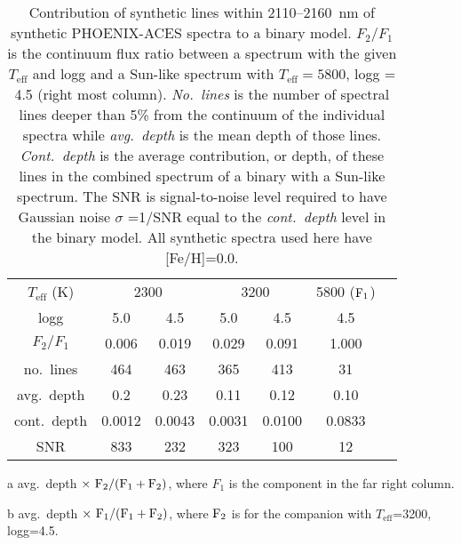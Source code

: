 
\begin{table}
    \small
    \centering
    \begin{threeparttable}[b]

   \caption{Contribution of synthetic lines within 2110--2160~nm of synthetic PHOENIX-ACES spectra to a binary model. \(F_{2}/F_{1}\) is the continuum flux ratio between a spectrum with the given \(T_{\textrm{eff}}\) and logg and a Sun-like spectrum with \(T_{\textrm{eff}}=5800\), logg = 4.5 (right most column). \emph{No.\ lines} is the number of spectral lines deeper than 5\% from the continuum of the individual spectra while \emph{avg.\ depth} is the mean depth of those lines. \emph{Cont.\ depth} is the average contribution, or depth, of these lines in the combined spectrum of a binary with a Sun-like spectrum. The SNR is signal-to-noise level required to have Gaussian noise \(\sigma\) =1/SNR equal to the \emph{cont.\ depth} level in the binary model. All synthetic spectra used here have [Fe/H]=0.0.}
    
    \begin{tabular}{*7c}
        \toprule
        \(T_{\textrm{eff}}\) (K)  & \multicolumn{2}{c}{2300} & \multicolumn{2}{c}{3200} & 5800 (\(\rm F_1\))\\
        logg & 5.0 & 4.5  & 5.0 & 4.5 & 4.5 \\
        \midrule
        \(F_2/F_1\) & 0.006 & 0.019 & 0.029  & 0.091 & 1.000 \\  
        no.\ lines & 464 & 463 & 365  & 413 & 31 \\
        avg.\ depth & 0.2  & 0.23& 0.11 & 0.12 & 0.10 \\
        cont.\ depth\tnote{a} &  0.0012 & 0.0043 &  0.0031 & 0.0100&  0.0833\tnote{b} \\ 
        SNR  & 833 & 232 & 323  & 100 & 12 \\ 
        \bottomrule
    \end{tabular}
 \label{tab:line_contributions}
    \begin{tablenotes}
        \item [a] avg.\ depth \(\times~ \rm F_2 / (F_1 + F_2)\), where \(F_1\) is the component in the far right column.
        \item[b] avg.\ depth \(\times~ \rm F_1 / (F_1 + F_2)\), where \(\rm F_2\) is for the companion with \(T_{\textrm{eff}}\)=3200, logg=4.5.
    \end{tablenotes}
  \end{threeparttable}
   
\end{table}